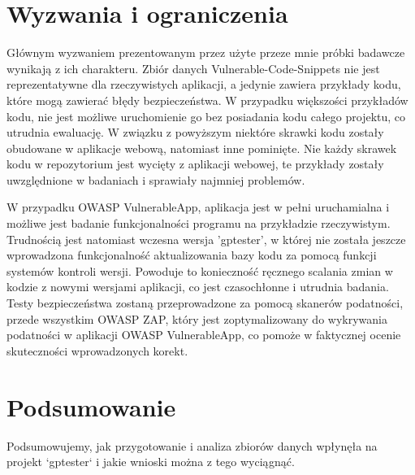 \section{Wyzwania i ograniczenia}
\label{sec:wyzwania_i_ograniczenia}

Głównym wyzwaniem prezentowanym przez użyte przeze mnie próbki badawcze wynikają z ich charakteru. Zbiór danych Vulnerable-Code-Snippets nie jest reprezentatywne dla rzeczywistych aplikacji, a jedynie zawiera przykłady kodu, które mogą zawierać błędy bezpieczeństwa. W przypadku większości przykładów kodu, nie jest możliwe uruchomienie go bez posiadania kodu całego projektu, co utrudnia ewaluację. W związku z powyższym niektóre skrawki kodu zostały obudowane w aplikacje webową, natomiast inne pominięte. Nie każdy skrawek kodu w repozytorium jest wycięty z aplikacji webowej, te przykłady zostały uwzględnione w badaniach i sprawiały najmniej problemów. 

W przypadku OWASP VulnerableApp, aplikacja jest w pełni uruchamialna i możliwe jest badanie funkcjonalności programu na przykładzie rzeczywistym. Trudnością jest natomiast wczesna wersja 'gptester', w której nie została jeszcze wprowadzona funkcjonalność aktualizowania bazy kodu za pomocą funkcji systemów kontroli wersji. Powoduje to konieczność ręcznego scalania zmian w kodzie z nowymi wersjami aplikacji, co jest czasochłonne i utrudnia badania. Testy bezpieczeństwa zostaną przeprowadzone za pomocą skanerów podatności, przede wszystkim OWASP ZAP, który jest zoptymalizowany do wykrywania podatności w aplikacji OWASP VulnerableApp, co pomoże w faktycznej ocenie skuteczności wprowadzonych korekt.


\section{Podsumowanie}
Podsumowujemy, jak przygotowanie i analiza zbiorów danych wpłynęła na projekt `gptester` i jakie wnioski można z tego wyciągnąć.

